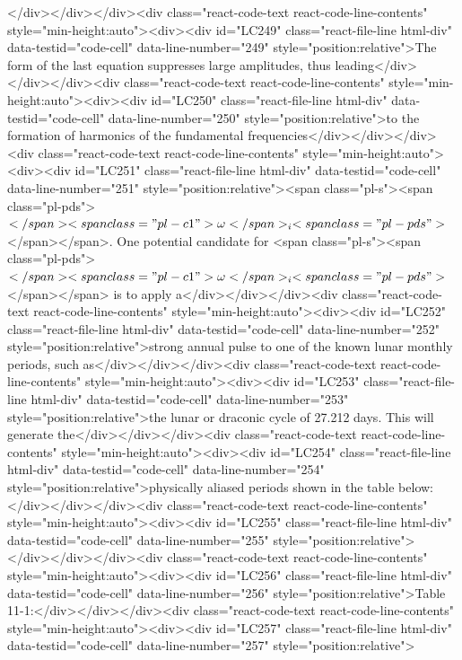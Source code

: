 {{</div></div></div><div class="react-code-text react-code-line-contents" style="min-height:auto"><div><div id="LC249" class="react-file-line html-div" data-testid="code-cell" data-line-number="249" style="position:relative">The form of the last equation suppresses large amplitudes, thus leading</div></div></div><div class="react-code-text react-code-line-contents" style="min-height:auto"><div><div id="LC250" class="react-file-line html-div" data-testid="code-cell" data-line-number="250" style="position:relative">to the formation of harmonics of the fundamental frequencies</div></div></div><div class="react-code-text react-code-line-contents" style="min-height:auto"><div><div id="LC251" class="react-file-line html-div" data-testid="code-cell" data-line-number="251" style="position:relative"><span class="pl-s"><span class="pl-pds">\(</span><span class="pl-c1">\omega</span>_{i}<span class="pl-pds">\)</span></span>. One potential candidate for <span class="pl-s"><span class="pl-pds">\(</span><span class="pl-c1">\omega</span>_{i}<span class="pl-pds">\)</span></span> is to apply a</div></div></div><div class="react-code-text react-code-line-contents" style="min-height:auto"><div><div id="LC252" class="react-file-line html-div" data-testid="code-cell" data-line-number="252" style="position:relative">strong annual pulse to one of the known lunar monthly periods, such as</div></div></div><div class="react-code-text react-code-line-contents" style="min-height:auto"><div><div id="LC253" class="react-file-line html-div" data-testid="code-cell" data-line-number="253" style="position:relative">the lunar or draconic cycle of 27.212 days. This will generate the</div></div></div><div class="react-code-text react-code-line-contents" style="min-height:auto"><div><div id="LC254" class="react-file-line html-div" data-testid="code-cell" data-line-number="254" style="position:relative">physically aliased periods shown in the table below:</div></div></div><div class="react-code-text react-code-line-contents" style="min-height:auto"><div><div id="LC255" class="react-file-line html-div" data-testid="code-cell" data-line-number="255" style="position:relative">
</div></div></div><div class="react-code-text react-code-line-contents" style="min-height:auto"><div><div id="LC256" class="react-file-line html-div" data-testid="code-cell" data-line-number="256" style="position:relative">Table 11-1:</div></div></div><div class="react-code-text react-code-line-contents" style="min-height:auto"><div><div id="LC257" class="react-file-line html-div" data-testid="code-cell" data-line-number="257" style="position:relative">
}}
